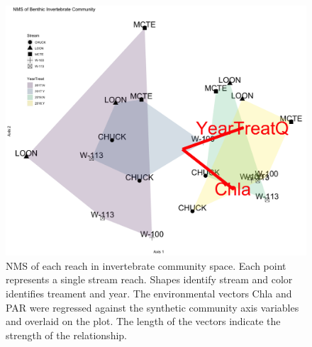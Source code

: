 \documentclass[double,12pt]{beavtex}
\begin{document}
  \begin{figure}
  
  {\centering \includegraphics[width=1\linewidth]{Figures/NMS-Benthic-1} 
  
  }
  
  \caption[NMS of each reach in invertebrate community space]{NMS of each reach in invertebrate community space. Each point represents a single stream reach. Shapes identify stream and color identifies treament and year. The environmental vectors Chla and PAR were regressed against the synthetic community axis variables and overlaid on the plot. The length of the vectors indicate the strength of the relationship.}\label{fig:unnamed-chunk-3}
  \end{figure}
  
\end{document}
